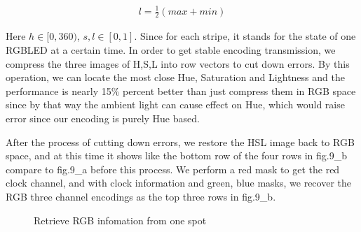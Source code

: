 \documentclass[conference]{IEEEtran}
\begin{document}
\begin{equation}
\begin{split}
	l=\frac{1}{2}(max+min)
\end{split}
\end{equation}

Here $h \in [0,360)$, $s, l \in [0,1]$. Since for each stripe, it stands for the state of one RGBLED at a certain time. In order to get stable encoding transmission, we compress the three images of H,S,L into row vectors to cut down errors. By this operation, we can locate the most close Hue, Saturation and Lightness and the performance is nearly 15\% percent better than just compress them in RGB space since by that way the ambient light can cause effect on Hue, which would raise error since our encoding is purely Hue based.

After the process of cutting down errors, we restore the HSL image back to RGB space, and at this time it shows like the bottom row of the four rows in fig.9\_b compare to fig.9\_a before this process. We perform a red mask to get the red  clock channel, and with clock information and green, blue masks, we recover the RGB three channel encodings as the top three rows in fig.9\_b.

\begin{figure} \centering
	\caption{Retrieve RGB infomation from one spot}
\end{figure}
\end{document}
